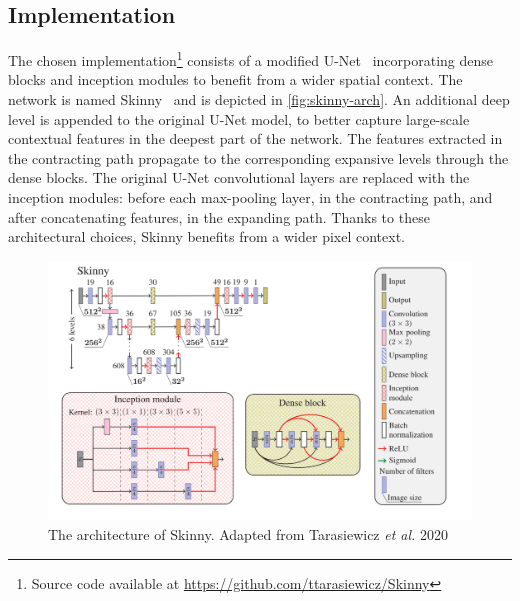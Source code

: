 \FloatBarrier
\subsection{Implementation}\label{sec:impl-unet}

The chosen implementation\footnote{Source code available at \url{https://github.com/ttarasiewicz/Skinny}} consists of a modified U-Net~\cite{ronneberger2015u} incorporating dense blocks and inception modules to benefit from a wider spatial context.
The network is named Skinny~\cite{tarasiewicz2020skinny} and is depicted in \autoref{fig:skinny-arch}.
An additional deep level is appended to the original U-Net model, to better capture large-scale contextual features in the deepest part of the network.
The features extracted in the contracting path propagate to the corresponding expansive levels through the dense blocks.
The original U-Net convolutional layers are replaced with the inception modules: before each max-pooling layer, in the contracting path, and after concatenating features, in the expanding path.
Thanks to these architectural choices, Skinny benefits from a wider pixel context.

\begin{figure}[h]
	\centering
	\includegraphics[width=0.9\linewidth]{images/approaches/deep_learning/skinny_arch.png}
	\caption{The architecture of Skinny.
	Adapted from Tarasiewicz \textit{et al.} 2020~\cite{tarasiewicz2020skinny}}
	\label{fig:skinny-arch}
\end{figure}


